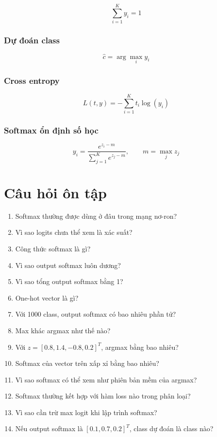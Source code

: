 \documentclass[12pt,a4paper]{report}
\begin{document}
\[
    \sum_{i=1}^{K} y_i = 1
\]

\subsection*{Dự đoán class}

\[
    \hat{c}=\arg\max_i y_i
\]

\subsection*{Cross entropy}

\[
    L(t,y)=-\sum_{i=1}^{K}t_i\log(y_i)
\]

\subsection*{Softmax ổn định số học}

\[
    y_i =
    \frac{e^{z_i-m}}
    {\sum_{j=1}^{K}e^{z_j-m}},
    \qquad
    m=\max_j z_j
\]

\chapter{Câu hỏi ôn tập}

\begin{enumerate}
    \item Softmax thường được dùng ở đâu trong mạng nơ-ron?
    \item Vì sao logits chưa thể xem là xác suất?
    \item Công thức softmax là gì?
    \item Vì sao output softmax luôn dương?
    \item Vì sao tổng output softmax bằng 1?
    \item One-hot vector là gì?
    \item Với 1000 class, output softmax có bao nhiêu phần tử?
    \item Max khác argmax như thế nào?
    \item Với $z=[0.8,1.4,-0.8,0.2]^T$, argmax bằng bao nhiêu?
    \item Softmax của vector trên xấp xỉ bằng bao nhiêu?
    \item Vì sao softmax có thể xem như phiên bản mềm của argmax?
    \item Softmax thường kết hợp với hàm loss nào trong phân loại?
    \item Vì sao cần trừ max logit khi lập trình softmax?
    \item Nếu output softmax là $[0.1,0.7,0.2]^T$, class dự đoán là class nào?
\end{enumerate}
\end{document}
